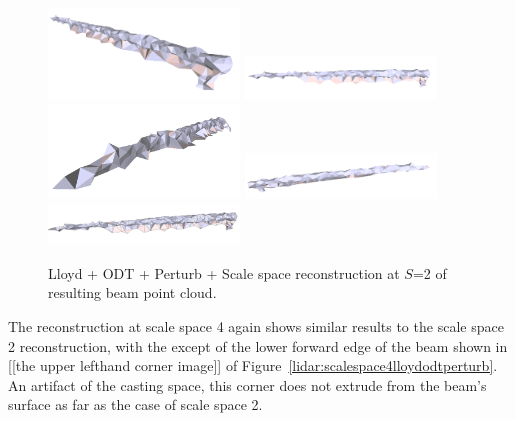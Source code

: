 \documentclass[12pt]{drexelthesis}
\begin{document}
\begin{figure}[!ht]
	\centering
		\includegraphics[width=2in]{real-lab-scans/meshed/optimized/scalespace2lloydodtperturb00.png}
		\includegraphics[width=2in]{real-lab-scans/meshed/optimized/scalespace2lloydodtperturb01.png}
		\includegraphics[width=2in]{real-lab-scans/meshed/optimized/scalespace2lloydodtperturb02.png}
		\includegraphics[width=2in]{real-lab-scans/meshed/optimized/scalespace2lloydodtperturb03.png}
		\includegraphics[width=2in]{real-lab-scans/meshed/optimized/scalespace2lloydodtperturb04.png}
		\caption[Lloyd + ODT + perturb +Scale space reconstruction at $S$=2 of segmented LiDAR data]{\centering Lloyd + ODT + Perturb + Scale space reconstruction at $S$=2 of resulting beam point cloud.}
	\label{lidar:scalespace2lloydodtperturb}
\end{figure}

The reconstruction at scale space 4 again shows similar results to the scale space 2 reconstruction, with the except of the lower forward edge of the beam shown in [[the upper lefthand corner image]] of Figure~\ref{lidar:scalespace4lloydodtperturb}. An artifact of the casting space, this corner does not extrude from the beam's surface as far as the case of scale space 2.
\end{document}
